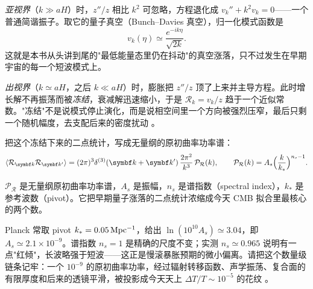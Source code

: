 \emph{亚视界}（\(k\gg aH\)）时，\(z''/z\) 相比 \(k^2\) 可忽略，方程退化成 \(v_k''+k^2v_k=0\)——一个普通简谐振子。取它的量子真空（Bunch–Davies 真空），归一化模式函数是
\[
  v_k(\eta)\simeq\frac{e^{-ik\eta}}{\sqrt{2k}} .
\]
这就是本书从头讲到尾的"最低能量态里仍在抖动"的真空涨落，只不过发生在早期宇宙的每一个短波模式上。

\emph{出视界}（\(k\simeq aH\)，之后 \(k\ll aH\)）时，膨胀把 \(z''/z\) 顶了上来并主导方程。此时增长解不再振荡而被\emph{冻结}，衰减解迅速缩小，于是 \(\mathcal R_k=v_k/z\) 趋于一个近似常数。"冻结"不是说模式停止演化，而是说相空间里一个方向被强烈压窄，最后只剩一个随机幅度，去支配后来的密度扰动 \citep{1988JETP...67.1297M,1990PhRvD..42.3413G,1996CQGra..13..377P}。

把这个冻结下来的二点统计，写成无量纲的原初曲率功率谱：
\begin{equation}
  \langle\mathcal R_{\bm k}\mathcal R_{\bm k'}\rangle
  =(2\pi)^3\delta^{(3)}(\bm k+\bm k')\,\frac{2\pi^2}{k^3}\,\mathcal P_{\mathcal R}(k),
  \qquad
  \mathcal P_{\mathcal R}(k)=A_s\Bigl(\frac{k}{k_*}\Bigr)^{n_s-1} .
  \label{eq:e23-primordial-spectrum}
\end{equation}
\begin{formulaexplain}
\(\mathcal P_{\mathcal R}\) 是无量纲原初曲率功率谱，\(A_s\) 是振幅，\(n_s\) 是谱指数（spectral index），\(k_*\) 是参考波数（pivot）。它把早期量子涨落的二点统计浓缩成今天 CMB 拟合里最核心的两个数。
\end{formulaexplain}
Planck 常取 pivot \(k_*=0.05\,{\rm Mpc^{-1}}\)，给出 \(\ln(10^{10}A_s)\simeq3.04\)，即 \(A_s\simeq2.1\times10^{-9}\)。谱指数 \(n_s=1\) 是精确的尺度不变；实测 \(n_s\simeq0.965\) 说明有一点"红倾"，长波略强于短波——这正是慢滚暴胀预期的微小偏离。请把这个数量级链条记牢：一个 \(10^{-9}\) 的原初曲率功率，经过辐射转移函数、声学振荡、复合面的有限厚度和后来的透镜平滑，被投影成今天天上 \(\Delta T/T\sim10^{-5}\) 的花纹 \citep{2020A&A...641A...6P,2020A&A...641A..10P}。


